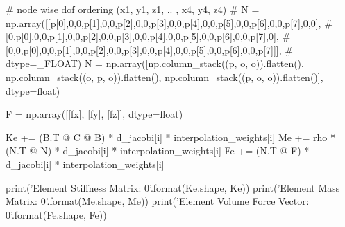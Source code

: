 \begin{python}
        # node wise dof ordering (x1, y1, z1, .. , x4, y4, z4)
        # N = np.array([[p[0],0,0,p[1],0,0,p[2],0,0,p[3],0,0,p[4],0,0,p[5],0,0,p[6],0,0,p[7],0,0],
        #               [0,p[0],0,0,p[1],0,0,p[2],0,0,p[3],0,0,p[4],0,0,p[5],0,0,p[6],0,0,p[7],0],
        #               [0,0,p[0],0,0,p[1],0,0,p[2],0,0,p[3],0,0,p[4],0,0,p[5],0,0,p[6],0,0,p[7]]],
        #               dtype=_FLOAT)
        N = np.array([np.column_stack((p, o, o)).flatten(),
                      np.column_stack((o, p, o)).flatten(),
                      np.column_stack((p, o, o)).flatten()], dtype=float)

        F = np.array([[fx], [fy], [fz]], dtype=float)

        Ke += (B.T @ C @ B) * d_jacobi[i] * interpolation_weights[i]
        Me += rho * (N.T @ N) * d_jacobi[i] * interpolation_weights[i]
        Fe += (N.T @ F) * d_jacobi[i] * interpolation_weights[i]

    print('Element Stiffness Matrix: {0}'.format(Ke.shape, Ke))
    print('Element Mass Matrix: {0}'.format(Me.shape, Me))
    print('Element Volume Force Vector: {0}'.format(Fe.shape, Fe))
\end{python}

